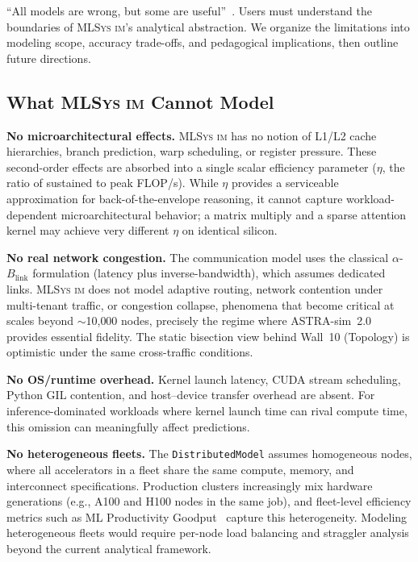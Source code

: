 \documentclass[10pt,twocolumn]{article}
\newcommand{\mlsysim}{\mbox{\textsc{MLSys}\,\textperiodcentered\,\textsc{im}}\xspace}
\begin{document}
``All models are wrong, but some are useful''~\citep{box1976}. Users must understand the boundaries of \mlsysim's analytical abstraction. We organize the limitations into modeling scope, accuracy trade-offs, and pedagogical implications, then outline future directions.

\subsection{What \mlsysim Cannot Model}

\textbf{No microarchitectural effects.} \mlsysim has no notion of L1/L2 cache hierarchies, branch prediction, warp scheduling, or register pressure. These second-order effects are absorbed into a single scalar efficiency parameter ($\eta$, the ratio of sustained to peak FLOP/s). While $\eta$ provides a serviceable approximation for back-of-the-envelope reasoning, it cannot capture workload-dependent microarchitectural behavior; a matrix multiply and a sparse attention kernel may achieve very different $\eta$ on identical silicon.

\textbf{No real network congestion.} The communication model uses the classical $\alpha$-$B_{\text{link}}$ formulation (latency plus inverse-bandwidth), which assumes dedicated links. \mlsysim does not model adaptive routing, network contention under multi-tenant traffic, or congestion collapse, phenomena that become critical at scales beyond $\sim$10{,}000 nodes, precisely the regime where ASTRA-sim~2.0~\citep{won2023} provides essential fidelity. The static bisection view behind Wall~10 (Topology) is optimistic under the same cross-traffic conditions.

\textbf{No OS/runtime overhead.} Kernel launch latency, CUDA stream scheduling, Python GIL contention, and host--device transfer overhead are absent. For inference-dominated workloads where kernel launch time can rival compute time, this omission can meaningfully affect predictions.

\textbf{No heterogeneous fleets.} The \texttt{DistributedModel} assumes homogeneous nodes, where all accelerators in a fleet share the same compute, memory, and interconnect specifications. Production clusters increasingly mix hardware generations (e.g., A100 and H100 nodes in the same job), and fleet-level efficiency metrics such as ML Productivity Goodput~\citep{wongpanich2025fleet} capture this heterogeneity. Modeling heterogeneous fleets would require per-node load balancing and straggler analysis beyond the current analytical framework.
\end{document}
